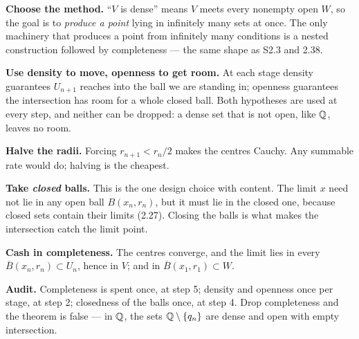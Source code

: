 \begin{proofwalk}
  \item \textbf{Choose the method.} ``$V$ is dense'' means $V$ meets every
        nonempty open $W$, so the goal is to \emph{produce a point} lying in
        infinitely many sets at once. The only machinery that produces a
        point from infinitely many conditions is a nested construction
        followed by completeness --- the same shape as S2.3 and 2.38.
  \item \textbf{Use density to move, openness to get room.} At each stage
        density guarantees $U_{n+1}$ reaches into the ball we are standing
        in; openness guarantees the intersection has room for a whole closed
        ball. Both hypotheses are used at every step, and neither can be
        dropped: a dense set that is not open, like $\mathbb{Q}$, leaves no room.
  \item \textbf{Halve the radii.} Forcing $r_{n+1} < r_n/2$ makes the centres
        Cauchy. Any summable rate would do; halving is the cheapest.
  \item \textbf{Take \emph{closed} balls.} This is the one design choice with
        content. The limit $x$ need not lie in any open ball $B(x_n,r_n)$,
        but it must lie in the closed one, because closed sets contain their
        limits (2.27). Closing the balls is what makes the intersection
        catch the limit point.
  \item \textbf{Cash in completeness.} The centres converge, and the limit
        lies in every $\overline B(x_n,r_n) \subset U_n$, hence in $V$; and
        in $\overline B(x_1,r_1) \subset W$.
  \item \textbf{Audit.} Completeness is spent once, at step 5; density and
        openness once per stage, at step 2; closedness of the balls once, at
        step 4. Drop completeness and the theorem is false --- in $\mathbb{Q}$, the
        sets $\mathbb{Q} \setminus \{q_n\}$ are dense and open with empty
        intersection.
\end{proofwalk}

